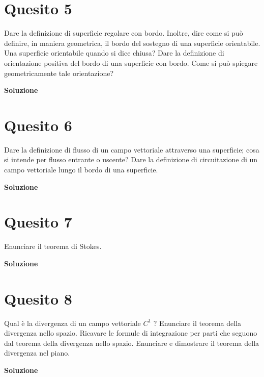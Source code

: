 \section*{Quesito 5}
Dare la definizione di superficie regolare con bordo. Inoltre, dire come si
può definire, in maniera geometrica, il bordo del sostegno di una superficie orientabile.
Una superficie orientabile quando si dice chiusa? Dare la definizione di orientazione
positiva del bordo di una superficie con bordo. Come si può spiegare geometricamente
tale orientazione?


\medskip
\begin{large}
\textbf{Soluzione}
\end{large}


\section*{Quesito 6}
Dare la definizione di flusso di un campo vettoriale attraverso una superficie;
cosa si intende per flusso entrante o uscente? Dare la definizione di circuitazione di un
campo vettoriale lungo il bordo di una superficie.


\medskip
\begin{large}
\textbf{Soluzione}
\end{large}


\section*{Quesito 7}
Enunciare il teorema di Stokes.

\medskip
\begin{large}
\textbf{Soluzione}
\end{large}


\section*{Quesito 8}
Qual è la divergenza di un campo vettoriale $C^1$ ? Enunciare il teorema della
divergenza nello spazio. Ricavare le formule di integrazione per parti che seguono dal
teorema della divergenza nello spazio. Enunciare e dimostrare il teorema della divergenza
nel piano.


\medskip
\begin{large}
\textbf{Soluzione}
\end{large}


